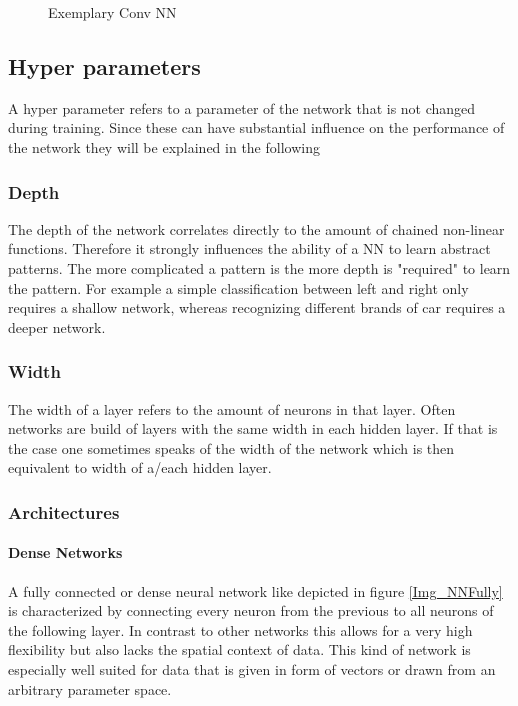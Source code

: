 			\begin{figure}
				\caption{Exemplary Conv NN}
				\label{Img_NNConv}
			\end{figure}
		

			
		 
		\subsection{Hyper parameters}
			\label{HyperPar}
			A hyper parameter refers to a parameter of the network that is not changed during training. Since these can have substantial influence on the performance of the network they will be explained in the following
			\subsubsection{Depth}
				The depth of the network correlates directly to the amount of chained non-linear functions. Therefore it strongly influences the ability of a NN to learn abstract patterns. The more complicated a pattern is the more depth is "required" to learn the pattern. For example a simple classification between left and right only requires a shallow network, whereas recognizing different brands of car requires a deeper network.
			\subsubsection{Width}
				The width of a layer refers to the amount of neurons in that layer. Often networks are build of layers with the same width in each hidden layer. If that is the case one sometimes speaks of the width of the network which is then equivalent to width of a/each hidden layer.
			\subsubsection{Architectures}
				\paragraph{Dense Networks}
					A fully connected or dense neural network like depicted in figure \ref{Img_NNFully} is characterized by connecting every neuron from the previous to all neurons of the following layer. In contrast to other networks this allows for a very high flexibility but also lacks the spatial context of data. This kind of network is especially well suited for data that is given in form of vectors or drawn from an arbitrary parameter space.
